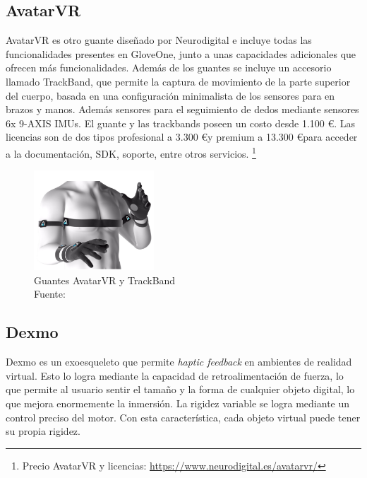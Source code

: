 
    
\subsection{AvatarVR}
    	AvatarVR es otro guante diseñado por Neurodigital e incluye todas las funcionalidades presentes en GloveOne, junto a unas capacidades adicionales que ofrecen más funcionalidades. Además de los guantes se incluye un accesorio llamado TrackBand, que permite la captura de movimiento de la parte superior del cuerpo, basada en una configuración minimalista de los sensores  para en brazos y manos. Además sensores para el seguimiento de dedos mediante sensores 6x 9-AXIS IMUs. El guante y las trackbands poseen un costo desde 1.100 \euro \space.  Las licencias son de dos tipos profesional a 3.300 \euro \space y premium  a 13.300 \euro  \space para acceder a la documentación, SDK, soporte, entre otros servicios. 
	\footnote{Precio AvatarVR y licencias: \url{https://www.neurodigital.es/avatarvr/}}
        
\begin{figure}[H]
  \begin{center} 
   	\includegraphics[width=0.4\textwidth]{images/fig-analisis-solucion/avatar-VR.png} 
     \caption[Guantes AvatarVR y TrackBand]{Guantes AvatarVR y TrackBand \\Fuente: \cite{avatarvr-info-page}} 
    \label{fig:avatarVR}
  \end{center}
\end{figure}

        
\subsection{Dexmo} 
    Dexmo es un exoesqueleto que permite \textit{haptic feedback} en ambientes de realidad virtual. Esto lo logra mediante la capacidad de retroalimentación de fuerza, lo que permite al usuario sentir el tamaño y la forma de cualquier objeto digital, lo que mejora enormemente la inmersión. La rigidez variable se logra mediante un control preciso del motor. Con esta característica, cada objeto virtual puede tener su propia rigidez.
    
